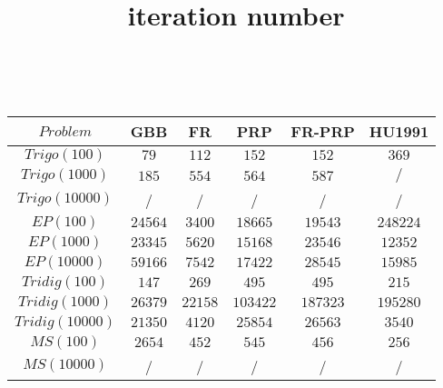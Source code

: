 \documentclass{article}
\begin{document}
\begin{table}[h!]
\title{ iteration number }
\\
	\centering
	\begin{tabular}{|c||c|c|c|c|c|}
		\hline
		 $Problem$ & GBB & FR & PRP & FR-PRP & HU1991 \\ \hline
		  
		 $Trigo(100)$ & $79$ & $112$ & $152$ & $152$ & $369$ \\ \hline
		 
		 $Trigo(1000)$ & $185$ & $554$ & $564$ & $587$ & $/$ \\ \hline
		 
		 $Trigo(10000)$ & / & / & / & / & / \\ \hline
		 
		 $EP(100)$ & $24564$ & $3400$ & $18665$ & $19543$ & $248224$ \\ \hline
		 
		 $EP(1000)$ & $23345$ & $5620$ & $15168$ & $23546$ & $12352$ \\ \hline
		  
		 $EP(10000)$ & $59166$ & $7542$ & $17422$ & $28545$ & $15985$ \\ \hline
		 
		 $Tridig(100)$ & $147$ & $269$ & $495$ & $495$ & $215$ \\ \hline
		 
		 $Tridig(1000)$ & $26379$ & $22158$ & $103422$ & $187323$ & $195280$ \\ \hline
		 
		 $Tridig(10000)$ & $21350$ & $4120$ & $25854$ & $26563$ & $3540$ \\ \hline
		 
		 $MS(100)$ & $2654$ & $452$ & $545$ & $456$ & $256$ \\ \hline
		 
		 $MS(10000)$ & / & / & / & / & / \\ \hline
		  
		
	\end{tabular}

\end{table}
\end{document}
